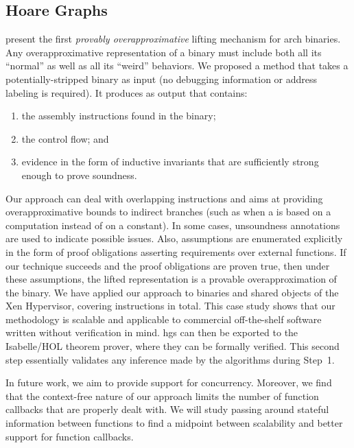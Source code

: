 \subsection{Hoare Graphs}
 present the first \emph{provably overapproximative} lifting mechanism for \gls{arch} binaries.
Any overapproximative representation of a binary must include both all its ``normal'' as well as all its ``weird'' behaviors.
We proposed a method that takes a potentially-stripped binary as input (no debugging information or address labeling is required).
It produces  as output that contains:
\begin{enumerate}
  \item the assembly instructions found in the binary;
  \item the control flow; and
  \item evidence in the form of inductive invariants that are sufficiently strong enough to prove soundness.
\end{enumerate}
Our approach can deal with overlapping instructions and aims at providing overapproximative bounds to indirect branches (such as when a  is based on a computation instead of on a constant).
In some cases, unsoundness annotations are used to indicate possible issues.
Also, assumptions are enumerated explicitly in the form of proof obligations asserting requirements over external functions.
If our technique succeeds and the proof obligations are proven true, then under these assumptions, the lifted representation is a provable overapproximation of the binary.
We have applied our approach to binaries and shared objects of the Xen Hypervisor, covering  instructions in total.
This case study shows that our methodology is scalable and applicable to commercial off-the-shelf software written without verification in mind.
\Acp{hg} can then be exported to the Isabelle/HOL theorem prover, where they can be formally verified.
This second step essentially validates any inference made by the algorithms during Step~1.

In future work, we aim to provide support for concurrency.
Moreover, we find that the context-free nature of our approach limits the number of function callbacks that are properly dealt with.
We will study passing around stateful information between functions to find a midpoint between scalability and better support for function callbacks.


